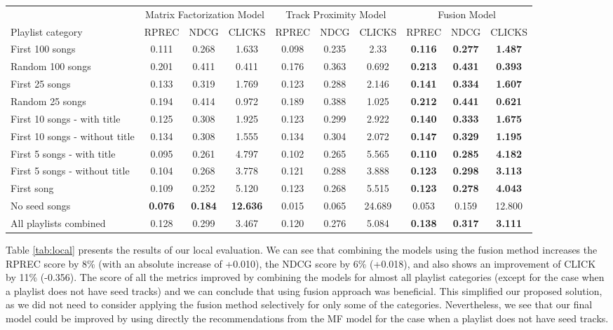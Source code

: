 \begin{table*}
  \caption{Local evaluation results}
  \label{tab:local}
  \begin{tabular}{lccccccccc}
    \toprule
&\multicolumn{3}{c}{Matrix Factorization Model}&\multicolumn{3}{c}{Track Proximity Model}&\multicolumn{3}{c}{Fusion Model}\\
Playlist category&RPREC&NDCG&CLICKS&RPREC&NDCG&CLICKS&RPREC&NDCG&CLICKS\\
    \midrule  
First 100 songs&0.111&0.268&1.633&0.098&0.235&2.33&\textbf{0.116}&\textbf{0.277}&\textbf{1.487}\\
Random 100 songs&0.201&0.411&0.411&0.176&0.363&0.692&\textbf{0.213}&\textbf{0.431}&\textbf{0.393}\\
First 25 songs&0.133&0.319&1.769&0.123&0.288&2.146&\textbf{0.141}&\textbf{0.334}&\textbf{1.607}\\
Random 25 songs&0.194&0.414&0.972&0.189&0.388&1.025&\textbf{0.212}&\textbf{0.441}&\textbf{0.621}\\
First 10 songs - with title&0.125&0.308&1.925&0.123&0.299&2.922&\textbf{0.140}&\textbf{0.333}&\textbf{1.675}\\
First 10 songs - without title&0.134&0.308&1.555&0.134&0.304&2.072&\textbf{0.147}&\textbf{0.329}&\textbf{1.195}\\
First 5 songs - with title&0.095&0.261&4.797&0.102&0.265&5.565&\textbf{0.110}&\textbf{0.285}&\textbf{4.182}\\
First 5 songs - without title&0.104&0.268&3.778&0.121&0.288&3.888&\textbf{0.123}&\textbf{0.298}&\textbf{3.113}\\
First song&0.109&0.252&5.120&0.123&0.268&5.515&\textbf{0.123}&\textbf{0.278}&\textbf{4.043}\\
No seed songs&\textbf{0.076}&\textbf{0.184}&\textbf{12.636}&0.015&0.065&24.689&0.053&0.159&12.800\\
\midrule 
All playlists combined&0.128&0.299&3.467&0.120&0.276&5.084&\textbf{0.138}&\textbf{0.317}&\textbf{3.111}\\
    \bottomrule
  \end{tabular}
\end{table*}

Table \ref{tab:local} presents the results of our local evaluation. We can see that combining the models using the fusion method increases the RPREC score by 8\% (with an absolute increase of +0.010), the NDCG score by 6\% (+0.018), and also shows an improvement of CLICK by 11\% (-0.356). The score of all the metrics improved by combining the models for almost all playlist categories (except for the case when a playlist does not have seed tracks) and we can conclude that using fusion approach was beneficial. This simplified our proposed solution, as we did not need to consider applying the fusion method selectively for only some of the categories. Nevertheless, we see that our final model could be improved by using directly the recommendations from the MF model for the case when a playlist does not have seed tracks.

